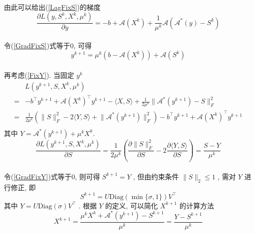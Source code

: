 \documentclass[UTF8]{ctexart}
\newcommand{\equSplit}[1]{\begin{equation}\begin{split}#1\end{split}\end{equation}}
\newcommand{\equ}[1]{\begin{equation}#1\end{equation}}
\newcommand{\norm}[1]{\lVert#1\rVert}
\newcommand{\inprod}[1]{\langle#1\rangle}
\newcommand{\Ma}{\mathcal{A}}
\newcommand{\partD}[2]{\frac{\partial#1}{\partial#2}}
\numberwithin{equation}{section}
\begin{document}
			\paragraph{}
				\quad 由此可以给出(\ref{LagFixS})的梯度
				\equ{\label{GradFixS}
						\partD{L(y, S^k, X^k, \mu^k)}{y}
					=	-b + \Ma(X^k) + \frac{1}{\mu^k} \Ma(\Ma^*(y) - S^k)
				}

			\paragraph{}
				\quad 令(\ref{GradFixS})式等于0, 可得
				\equ{\label{dualAY}
					y^{k + 1} = \mu^k(b - \Ma(X^k)) + \Ma(S^k)
				}

			\paragraph{}
				\quad 再考虑(\ref{FixY}). 当固定 $y^k$
				\equSplit{\label{LagFixY}
						& L(y^{k + 1},S,X^k,\mu^k)\\
					=	& -b^\top y^{k + 1} + \Ma(X^k)^\top y^{k + 1} - \inprod{X, S} + \frac{1}{2\mu^k} \norm{\Ma^*(y^{k + 1}) - S}^2_F\\
					=	& \frac{1}{2\mu^k}(\norm{S}_F^2 - 2\inprod{Y, S} + \norm{\Ma^*(y^{k + 1})}_F^2) - b^\top y^{k + 1} + \Ma(X^k)^\top y^{k + 1}\\
				}
				其中 $Y = \Ma^*(y^{k + 1}) + \mu^k X^k$.
				\equ{\label{GradFixY}
						\partD{L(y^{k + 1},S,X^k,\mu^k)}{S}
					=	\frac{1}{2\mu^k}(\partD{\norm{S}_F^2}{S} - 2 \partD{\inprod{Y, S}}{S})
					=	\frac{S - Y}{\mu^k}
				}

			\paragraph{}
				\quad 令(\ref{GradFixY})式等于0, 则可得 $S^{k + 1} = Y$ , 但由约束条件 $\norm{S}_2 \leq 1$ , 需对 $Y$ 进行修正, 即
				\equ{\label{dualAS}
					S^{k + 1} = U \text{Diag}(\min \{\sigma, 1\}) V^\top
				}
				其中 $Y = U \text{Diag}(\sigma) V^\top$ . 根据 $Y$ 的定义, 可以简化 $X^{k + 1}$ 的计算方法
				\equ{\label{dualAX}
						X^{k + 1}
					=	\frac{\mu^kX^k + \Ma^*(y^{k + 1})-S^{k + 1}}{\mu^k}
					=	\frac{Y - S^{k + 1}}{\mu^k}
				}
\end{document}
